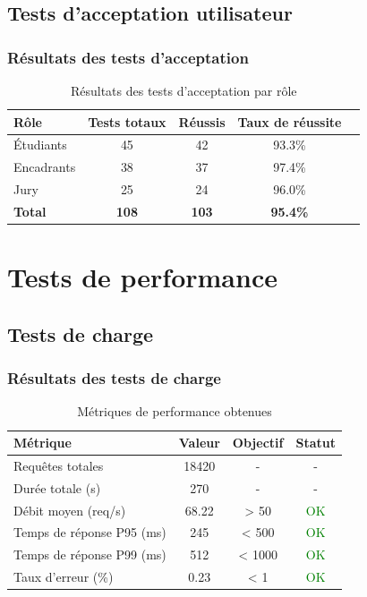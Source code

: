 \subsection{Tests d'acceptation utilisateur}

\subsubsection{Résultats des tests d'acceptation}
\begin{table}[h!]
\centering
\caption{Résultats des tests d'acceptation par rôle}
\label{tab:acceptance-tests}
\begin{tabular}{|l|c|c|c|c|}
\hline
\textbf{Rôle} & \textbf{Tests totaux} & \textbf{Réussis} & \textbf{Taux de réussite} \\
\hline
Étudiants & 45 & 42 & 93.3\% \\
\hline
Encadrants & 38 & 37 & 97.4\% \\
\hline
Jury & 25 & 24 & 96.0\% \\
\hline
\textbf{Total} & \textbf{108} & \textbf{103} & \textbf{95.4\%} \\
\hline
\end{tabular}
\end{table}

\section{Tests de performance}

\subsection{Tests de charge}

\subsubsection{Résultats des tests de charge}
\begin{table}[h!]
\centering
\caption{Métriques de performance obtenues}
\label{tab:performance}
\begin{tabular}{|l|c|c|c|}
\hline
\textbf{Métrique} & \textbf{Valeur} & \textbf{Objectif} & \textbf{Statut} \\
\hline
Requêtes totales & 18420 & - & - \\
\hline
Durée totale (s) & 270 & - & - \\
\hline
Débit moyen (req/s) & 68.22 & > 50 & \textcolor{green}{OK} \\
\hline
Temps de réponse P95 (ms) & 245 & < 500 & \textcolor{green}{OK} \\
\hline
Temps de réponse P99 (ms) & 512 & < 1000 & \textcolor{green}{OK} \\
\hline
Taux d'erreur (\%) & 0.23 & < 1 & \textcolor{green}{OK} \\
\hline
\end{tabular}
\end{table}

